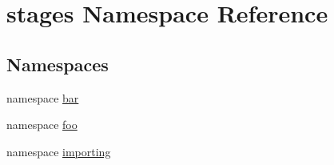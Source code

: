 \hypertarget{namespacestages}{\section{stages \-Namespace \-Reference}
\label{namespacestages}
}
\subsection*{\-Namespaces}
\begin{DoxyCompactItemize}
\item 
namespace \hyperlink{namespacestages_1_1bar}{bar}
\item 
namespace \hyperlink{namespacestages_1_1foo}{foo}
\item 
namespace \hyperlink{namespacestages_1_1importing}{importing}
\end{DoxyCompactItemize}
